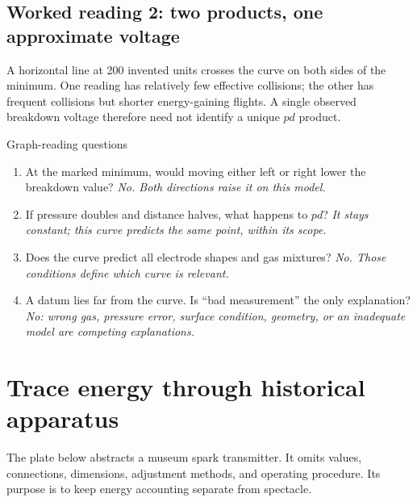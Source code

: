 \subsection{Worked reading 2: two products, one approximate voltage}
A horizontal line at 200 invented units crosses the curve on both sides of the
minimum. One reading has relatively few effective collisions; the other has
frequent collisions but shorter energy-gaining flights. A single observed
breakdown voltage therefore need not identify a unique \(pd\) product.

\begin{teloscard}{Graph-reading questions}
\begin{enumerate}[leftmargin=*,itemsep=.35em]
\item At the marked minimum, would moving either left or right lower the
breakdown value? \emph{No. Both directions raise it on this model.}
\item If pressure doubles and distance halves, what happens to \(pd\)?
\emph{It stays constant; this curve predicts the same point, within its scope.}
\item Does the curve predict all electrode shapes and gas mixtures?
\emph{No. Those conditions define which curve is relevant.}
\item A datum lies far from the curve. Is ``bad measurement'' the only
explanation? \emph{No: wrong gas, pressure error, surface condition, geometry,
or an inadequate model are competing explanations.}
\end{enumerate}
\end{teloscard}

\section{Trace energy through historical apparatus}

The plate below abstracts a museum spark transmitter. It omits values,
connections, dimensions, adjustment methods, and operating procedure. Its
purpose is to keep energy accounting separate from spectacle.

